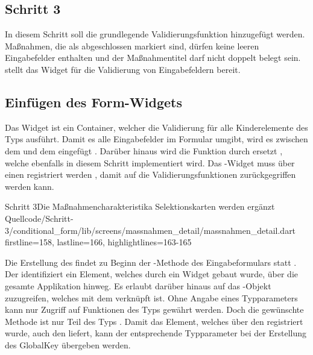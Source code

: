 \clearpage 


\subsection{Schritt 3}

In diesem Schritt soll die grundlegende Validierungsfunktion hinzugefügt werden.
Maßnahmen, die als abgeschlossen markiert sind, dürfen keine leeren Eingabefelder enthalten und der Maßnahmentitel darf nicht doppelt belegt sein.  stellt das Widget  für die Validierung von Eingabefeldern bereit. 

\subsection{Einfügen des Form-Widgets}

Das Widget  ist ein Container, welcher die Validierung für alle Kinderelemente des Typs  ausführt. 
Damit es alle Eingabefelder im Formular umgibt, wird es zwischen dem  und dem  eingefügt . 
Darüber hinaus wird die Funktion  durch  ersetzt , welche ebenfalls in diesem Schritt implementiert wird. 
Das -Widget muss über einen  registriert werden , damit auf die Validierungsfunktionen zurückgegriffen werden kann.

\begin{alexlisting}{Schritt 3}{Die Maßnahmencharakteristika Selektionskarten werden ergänzt}
    {Quellcode/Schritt-3/conditional_form/lib/screens/massnahmen_detail/massnahmen_detail.dart}
    {firstline=158, lastline=166, highlightlines={163-165}}
    \label{lst:Schritt3Form}
\end{alexlisting}
 
Die Erstellung des  findet zu Beginn der -Methode des Eingabeformulars statt . 
Der  identifiziert ein Element, welches durch ein Widget gebaut wurde, über die gesamte Applikation hinweg. 
Es erlaubt darüber hinaus auf das -Objekt zuzugreifen, welches mit dem  verknüpft ist. 
Ohne Angabe eines Typparameters kann nur Zugriff auf Funktionen des Typs  gewährt werden. 
Doch die gewünschte Methode  ist nur Teil des Typs . 
Damit das Element, welches über den  registriert wurde, auch den  liefert, kann der entsprechende Typparameter  bei der Erstellung des GlobalKey übergeben werden.

